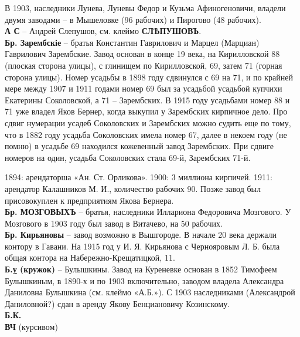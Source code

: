 В 1903, наследники Лунева, Луневы Федор и Кузьма Афиногеновичи, владели двумя заводами – в Мышеловке (96 рабочих) и Пирогово (48 рабочих).\\

\noindent\textbf{А С} – Андрей Слепушов, см. клеймо \textbf{СЛѢПУШОВЪ}.\\ 

\noindent\textbf{Бр. Зарембскіе} – братья Константин Гаврилович и Марцел (Марциан) Гаврилович Зарембские. Завод основан в конце 19 века, на Кирилловской 88 (плоская сторона улицы), с глинищем по Кирилловской, 69, затем 71 (горная сторона улицы). Номер усадьбы в 1898 году сдвинулся с 69 на 71, и по крайней мере между 1907 и 1911 годами номер 69 был за усадьбой усадьбой купчихи Екатерины Соколовской, а 71 – Зарембских. В 1915 году усадьбами номер 88 и 71 уже владел Яков Бернер, когда выкупил у Зарембских кирпичное дело. Про сдвиг нумерации усадеб Соколовских и Зарембских можно судить еще по тому, что в 1882 году усадьба Соколовских имела номер 67, далее в некоем году (не помню) в усадьбе 69 находился кожевенный завод Зарембских. При сдвиге номеров на один, усадьба Соколовских стала 69-й, Зарембских 71-й.

1894: арендаторша «Ан. Ст. Орликова». 1900: 3 миллиона кирпичей. 1911: арендатор Калашников М. И., количество рабочих 90. Позже завод был присовокуплен к предприятиям Якова Бернера.\\

\noindent\textbf{Бр. МОЗГОВЫХЪ} – братья, наследники Иллариона Федоровича Мозгового. У Мозгового в 1903 году был завод в Витачево, на 50 рабочих.\\

\noindent\textbf{Бр. Кирьяновы} – завод возможно в Вышгороде. В начале 20 века держали контору в Гавани. На 1915 год у И. Я. Кирьянова с Чернояровым Л. Б. была общая контора на Набережно-Крещатицкой, 11.\\

\noindent\textbf{Б.\underline{у} (кружок)} – Булышкины. Завод на Куреневке основан в 1852 Тимофеем Булышкиным, в 1890-х и по 1903 включительно, заводом владела Александра Даниловна Булышкина (см. клеймо «А.Б.»). С 1903 наследниками (Александрой Даниловной?) сдан в аренду Якову Бенциановичу Козинскому.\\ 

\noindent\textbf{Б.К.}\\

\noindent\textbf{ВЧ} (курсивом)\\

